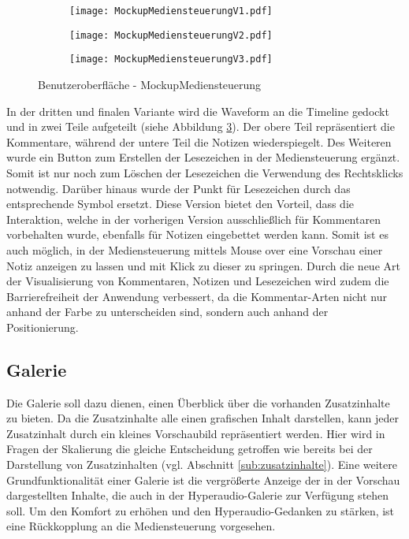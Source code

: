 \begin{figure}[h!]
\begin{subfigure}[c]{\textwidth}
\texttt{[image: MockupMediensteuerungV1.pdf]}
\label{fig:MockupMediensteuerungV1}
\end{subfigure}
\par\bigskip
\begin{subfigure}[c]{\textwidth}
\texttt{[image: MockupMediensteuerungV2.pdf]}
\label{fig:MockupMediensteuerungV2}
\end{subfigure}
\par\bigskip
\begin{subfigure}[c]{\textwidth}
\texttt{[image: MockupMediensteuerungV3.pdf]}
\label{fig:MockupMediensteuerungV3}
\end{subfigure}
\caption{Benutzeroberfläche - MockupMediensteuerung}
\label{fig:MockupMediensteuerung}
\end{figure}

In der dritten und finalen Variante wird die Waveform an die Timeline gedockt und in zwei Teile aufgeteilt (siehe Abbildung \ref{fig:MockupMediensteuerungV3}). Der obere Teil repräsentiert die Kommentare, während der untere Teil die Notizen wiederspiegelt. Des Weiteren wurde ein Button zum Erstellen der Lesezeichen in der Mediensteuerung ergänzt. Somit ist nur noch zum Löschen der Lesezeichen die Verwendung des Rechtsklicks notwendig. Darüber hinaus wurde der Punkt für Lesezeichen durch das entsprechende Symbol ersetzt. Diese Version bietet den Vorteil, dass die Interaktion, welche in der vorherigen Version ausschließlich für Kommentaren vorbehalten wurde, ebenfalls für Notizen eingebettet werden kann. Somit ist es auch möglich, in der Mediensteuerung mittels Mouse over eine Vorschau einer Notiz anzeigen zu lassen und mit Klick zu dieser zu springen. Durch die neue Art der Visualisierung von Kommentaren, Notizen und Lesezeichen wird zudem die Barrierefreiheit der Anwendung verbessert, da die Kommentar-Arten nicht nur anhand der Farbe zu unterscheiden sind, sondern auch anhand der Positionierung.

\subsection{Galerie}
Die Galerie soll dazu dienen, einen Überblick über die vorhanden Zusatzinhalte zu bieten. Da die Zusatzinhalte alle einen grafischen Inhalt darstellen, kann jeder Zusatzinhalt durch ein kleines Vorschaubild repräsentiert werden. Hier wird in Fragen der Skalierung die gleiche Entscheidung getroffen wie bereits bei der Darstellung von Zusatzinhalten (vgl. Abschnitt \ref{sub:zusatzinhalte}).
Eine weitere Grundfunktionalität einer Galerie ist die vergrößerte Anzeige der in der Vorschau dargestellten Inhalte, die auch in der Hyperaudio-Galerie zur Verfügung stehen soll. Um den Komfort zu erhöhen und den Hyperaudio-Gedanken zu stärken, ist eine Rückkopplung an die Mediensteuerung vorgesehen.

